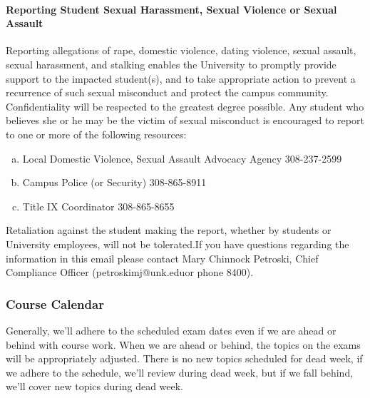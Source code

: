 \documentclass[12pt,fullpage]{article}
\newcounter{ex}\setcounter{ex}{0}
\newenvironment{alphalist}{
  \begin{enumerate}[(a)]
    \addtolength{\itemsep}{-0.5\itemsep}}
  {\end{enumerate}}
\begin{document}
\paragraph{Reporting Student Sexual Harassment, Sexual Violence or Sexual Assault} Reporting allegations of rape, domestic violence, dating violence, sexual assault, sexual harassment, and stalking enables the University to promptly provide support to the impacted student(s), and to take appropriate action to prevent a recurrence of such sexual misconduct and protect the campus community. Confidentiality will be respected to the greatest degree possible. Any student who believes she or he may be the victim of sexual misconduct is encouraged to report to one or more of the following resources:
\begin{alphalist}
\item Local Domestic Violence, Sexual Assault Advocacy Agency 308-237-2599

\item Campus Police (or Security) 308-865-8911

\item Title IX Coordinator 308-865-8655

\end{alphalist}
Retaliation against the student making the report, whether by students or University employees, will not be tolerated.If you have questions regarding the information in this email please 
contact Mary Chinnock Petroski, Chief Compliance Officer (petroskimj@unk.eduor phone 8400).



\subsubsection*{Course Calendar}

Generally, we'll adhere to the scheduled exam dates even if we are ahead or behind with course work.  When we are ahead or behind, the
topics on the exams will be appropriately adjusted.  There is no new topics scheduled for dead week, if we adhere to the schedule, we'll review during dead week, but
if we fall behind, we'll cover new topics during dead week.




\vspace{0.1in}
\end{document}
